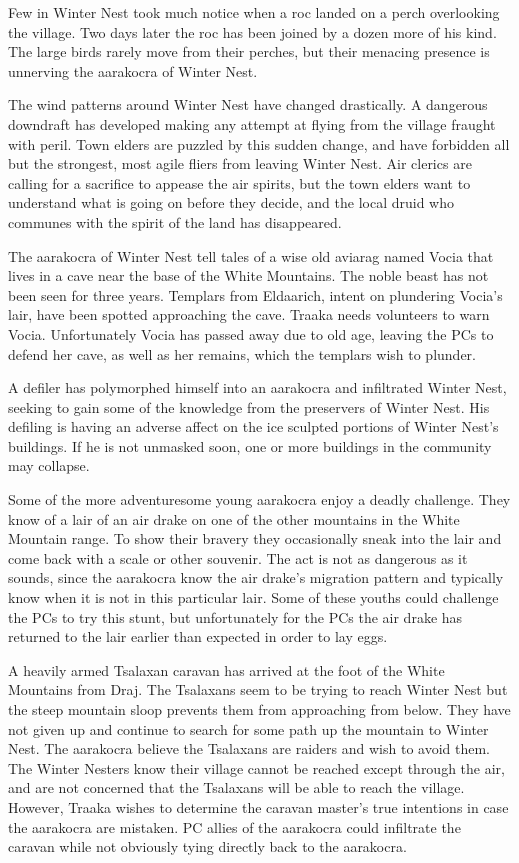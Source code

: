 {
	\item Few in Winter Nest took much notice when a roc landed on a perch overlooking the village. Two days later the roc has been joined by a dozen more of his kind. The large birds rarely move from their perches, but their menacing presence is unnerving the aarakocra of Winter Nest.
	\item The wind patterns around Winter Nest have changed drastically. A dangerous downdraft has developed making any attempt at flying from the village fraught with peril. Town elders are puzzled by this sudden change, and have forbidden all but the strongest, most agile fliers from leaving Winter Nest. Air clerics are calling for a sacrifice to appease the air spirits, but the town elders want to understand what is going on before they decide, and the local druid who communes with the spirit of the land has disappeared.
	\item The aarakocra of Winter Nest tell tales of a wise old aviarag named Vocia that lives in a cave near the base of the White Mountains. The noble beast has not been seen for three years. Templars from Eldaarich, intent on plundering Vocia's lair, have been spotted approaching the cave. Traaka needs volunteers to warn Vocia. Unfortunately Vocia has passed away due to old age, leaving the PCs to defend her cave, as well as her remains, which the templars wish to plunder.
	\item A defiler has polymorphed himself into an aarakocra and infiltrated Winter Nest, seeking to gain some of the knowledge from the preservers of Winter Nest. His defiling is having an adverse affect on the ice sculpted portions of Winter Nest's buildings. If he is not unmasked soon, one or more buildings in the community may collapse.
	\item Some of the more adventuresome young aarakocra enjoy a deadly challenge. They know of a lair of an air drake on one of the other mountains in the White Mountain range. To show their bravery they occasionally sneak into the lair and come back with a scale or other souvenir. The act is not as dangerous as it sounds, since the aarakocra know the air drake's migration pattern and typically know when it is not in this particular lair. Some of these youths could challenge the PCs to try this stunt, but unfortunately for the PCs the air drake has returned to the lair earlier than expected in order to lay eggs.
	\item A heavily armed Tsalaxan caravan has arrived at the foot of the White Mountains from Draj. The Tsalaxans seem to be trying to reach Winter Nest but the steep mountain sloop prevents them from approaching from below. They have not given up and continue to search for some path up the mountain to Winter Nest. The aarakocra believe the Tsalaxans are raiders and wish to avoid them. The Winter Nesters know their village cannot be reached except through the air, and are not concerned that the Tsalaxans will be able to reach the village. However, Traaka wishes to determine the caravan master's true intentions in case the aarakocra are mistaken. PC allies of the aarakocra could infiltrate the caravan while not obviously tying directly back to the aarakocra.
}

